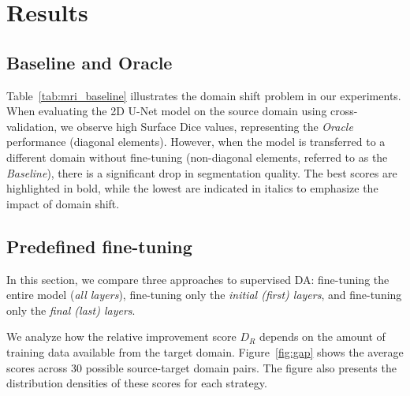 

\section{Results}


\subsection{Baseline and Oracle}

Table~\ref{tab:mri_baseline} illustrates the domain shift problem in our experiments. When evaluating the 2D U-Net model on the source domain using cross-validation, we observe high Surface Dice values, representing the \textit{Oracle} performance (diagonal elements). However, when the model is transferred to a different domain without fine-tuning (non-diagonal elements, referred to as the \textit{Baseline}), there is a significant drop in segmentation quality. The best scores are highlighted in bold, while the lowest are indicated in italics to emphasize the impact of domain shift.




\subsection{Predefined fine-tuning}

In this section, we compare three approaches to supervised DA: fine-tuning the entire model (\textit{all layers}), fine-tuning only the \textit{initial (first) layers}, and fine-tuning only the \textit{final (last) layers}.

We analyze how the relative improvement score $D_R$ depends on the amount of training data available from the target domain. Figure~\ref{fig:gap} shows the average scores across 30 possible source-target domain pairs. The figure also presents the distribution densities of these scores for each strategy.

